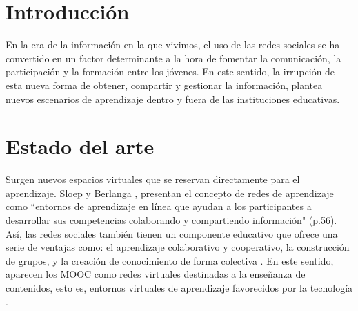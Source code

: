 \documentclass[12pt]{article}
\begin{document}
\maketitle

\begin{abstract}
Este trabajo tiene como objeto de estudio comprender la influencia de las interacciones entre los escenarios escolares y virtuales en los procesos de aprendizaje. As\'i pues, se ha llevado a cabo un estudio de caso de un alumno de ESO (Educaci\'on Secundaria Obligatoria) de 15 años de edad. Como herramientas de recogida de informaci\'on hemos utilizado las entrevistas en profundidad. Los resultados muestran el gran potencial que tienen las redes sociales para desarrollar el aprendizaje, la identidad y el capital social en los adolescentes.\\\\
Enlace al repositorio: \url{https://github.com/jmiguel22/proyecto_final.git}\\\\
\textbf{Palabras clave:} Aprendizaje, Redes sociales

\end{abstract}

\section{Introducci\'on}
En la era de la informaci\'on en la que vivimos, el uso de las redes sociales se ha convertido en un factor determinante a la hora de fomentar la comunicaci\'on, la participaci\'on y la formaci\'on entre los j\'ovenes. En este sentido, la irrupci\'on de esta nueva forma de obtener, compartir y gestionar la informaci\'on, plantea nuevos escenarios de aprendizaje dentro y fuera de las instituciones educativas. 

\section{Estado del arte}
Surgen nuevos espacios virtuales que se reservan directamente para el aprendizaje. Sloep y Berlanga \cite{sloep_learning_2011}, presentan el concepto de redes de aprendizaje como ``entornos de aprendizaje en l\'inea que ayudan a los participantes a desarrollar sus competencias colaborando y compartiendo informaci\'on" (p.56). As\'i, las redes sociales tambi\'en tienen un componente educativo que ofrece una serie de ventajas como: el aprendizaje colaborativo y cooperativo, la construcci\'on de grupos, y la creaci\'on de conocimiento de forma colectiva \cite{ortega_espacios_2008}. En este sentido, aparecen los MOOC como redes virtuales destinadas a la enseñanza de contenidos, esto es, entornos virtuales de aprendizaje favorecidos por la tecnolog\'ia \cite{bartolome-pina_are_2015}.
\end{document}
